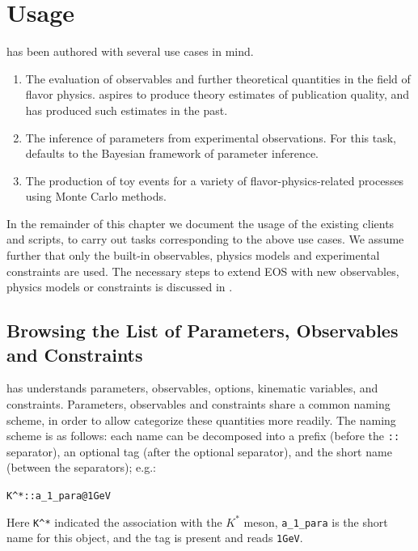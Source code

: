 
\chapter{Usage}
\label{ch:usage}

\EOS has been authored with several use cases in mind.
\begin{enumerate}
\item The evaluation of observables and further theoretical quantities in the
field of flavor physics. \EOS aspires to produce theory estimates of publication
quality, and has produced such estimates in the past.

\item The inference of parameters from experimental observations.  For this
task, \EOS defaults to the Bayesian framework of parameter inference.

\item The production of toy events for a variety of flavor-physics-related
processes using Monte Carlo methods.
\end{enumerate}

In the remainder of this chapter we document the usage of the existing \EOS
clients and scripts, to carry out tasks corresponding to the above use
cases. We assume further that only the built-in observables, physics models
and experimental constraints are used. The necessary steps to extend EOS with
new observables, physics models or constraints is discussed in .


\section{Browsing the List of Parameters, Observables and Constraints}
\label{sec:usage:parameters+observables+constraints}

\EOS has understands parameters, observables, options, kinematic variables, and
constraints.  Parameters, observables and constraints share a common naming
scheme, in order to allow categorize these quantities more readily. The naming
scheme is as follows: each name can be decomposed into a prefix (before the
\texttt{::} separator), an optional tag (after the optional \texttt{\@}
separator), and the short name (between the separators); e.g.:
\begin{center}
    \verb+K^*::a_1_para@1GeV+
\end{center}
Here \texttt{K\^{}*} indicated the association with the $K^*$ meson,
\texttt{a\_1\_para} is the short name for this object, and the tag is present and
reads \texttt{1GeV}.\\

